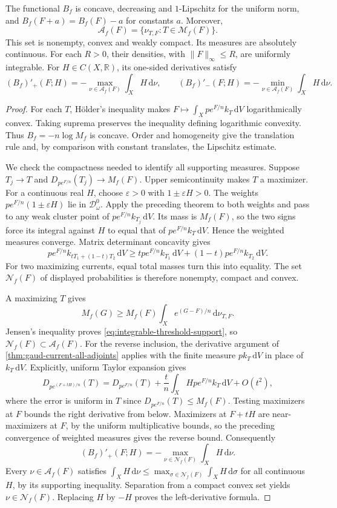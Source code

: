 \begin{proposition}\label{prop:integrable-threshold-adjoints}
The functional $B_f$ is concave, decreasing and $1$-Lipschitz for the uniform norm, and $B_f(F+a)=B_f(F)-a$ for constants $a$. Moreover,
\[
 \mathcal A_f(F)=\{\nu_{T,F}:T\in\mathscr M_f(F)\}.
\]
This set is nonempty, convex and weakly compact. Its measures are absolutely continuous. For each $R>0$, their densities, with $\|F\|_\infty\leq R$, are uniformly integrable. For $H\in C(X,\mathbb R)$, its one-sided derivatives satisfy
\[
 (B_f)'_+(F;H)=-\max_{\nu\in\mathcal A_f(F)}\int_XH\,\mathrm{d}\nu,
 \qquad
 (B_f)'_-(F;H)=-\min_{\nu\in\mathcal A_f(F)}\int_XH\,\mathrm{d}\nu.
\]
\end{proposition}
\begin{proof}
For each $T$, H\"older's inequality makes $F\mapsto\int_Xp e^{F/n}k_T\,\mathrm{d}V$ logarithmically convex. Taking suprema preserves the inequality defining logarithmic convexity. Thus $B_f=-n\log M_f$ is concave. Order and homogeneity give the translation rule and, by comparison with constant translates, the Lipschitz estimate.

We check the compactness needed to identify all supporting measures. Suppose $T_j\to T$ and $D_{p e^{F/n}}(T_j)\to M_f(F)$. Upper semicontinuity makes $T$ a maximizer. For a continuous real $H$, choose $\varepsilon>0$ with $1\pm\varepsilon H>0$. The weights $p e^{F/n}(1\pm\varepsilon H)$ lie in $\mathcal D_\omega^0$. Apply the preceding theorem to both weights and pass to any weak cluster point of $p e^{F/n}k_{T_j}\,\mathrm{d}V$. Its mass is $M_f(F)$, so the two signs force its integral against $H$ to equal that of $p e^{F/n}k_T\,\mathrm{d}V$. Hence the weighted measures converge. Matrix determinant concavity gives
\[
 p e^{F/n}k_{tT_1+(1-t)T_2}\,\mathrm{d}V
 \geq t p e^{F/n}k_{T_1}\,\mathrm{d}V
       +(1-t)p e^{F/n}k_{T_2}\,\mathrm{d}V.
\]
For two maximizing currents, equal total masses turn this into equality. The set $\mathscr N_f(F)$ of displayed probabilities is therefore nonempty, compact and convex.

A maximizing $T$ gives
\[
 M_f(G)\geq M_f(F)\int_Xe^{(G-F)/n}\,\mathrm{d}\nu_{T,F}.
\]
Jensen's inequality proves \eqref{eq:integrable-threshold-support}, so $\mathscr N_f(F)\subset\mathcal A_f(F)$. For the reverse inclusion, the derivative argument of \cref{thm:gaud-current-all-adjoints} applies with the finite measure $p k_T\,\mathrm{d}V$ in place of $k_T\,\mathrm{d}V$. Explicitly, uniform Taylor expansion gives
\[
 D_{p e^{(F+tH)/n}}(T)
 =D_{p e^{F/n}}(T)+\frac tn\int_X H p e^{F/n} k_T\,\mathrm{d}V+O(t^2),
\]
where the error is uniform in $T$ since $D_{p e^{F/n}}(T)\leq M_f(F)$. Testing maximizers at $F$ bounds the right derivative from below. Maximizers at $F+tH$ are near-maximizers at $F$, by the uniform multiplicative bounds, so the preceding convergence of weighted measures gives the reverse bound. Consequently
\[
 (B_f)'_+(F;H)=-\max_{\nu\in\mathscr N_f(F)}\int_XH\,\mathrm{d}\nu.
\]
Every $\nu\in\mathcal A_f(F)$ satisfies
$\int_XH\,\mathrm{d}\nu\leq\max_{\sigma\in\mathscr N_f(F)}\int_XH\,\mathrm{d}\sigma$ for all continuous $H$, by its supporting inequality. Separation from a compact convex set yields $\nu\in\mathscr N_f(F)$. Replacing $H$ by $-H$ proves the left-derivative formula.


\end{proof}
